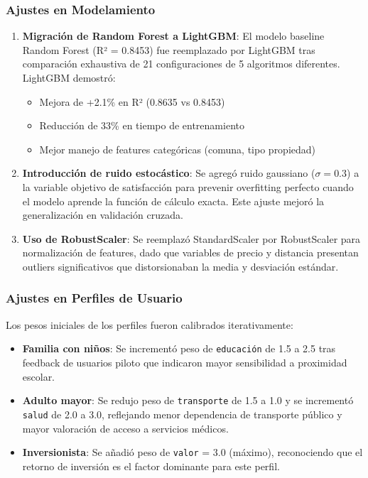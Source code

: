 \subsubsection{Ajustes en Modelamiento}

\begin{enumerate}
    \item \textbf{Migración de Random Forest a LightGBM}: El modelo baseline Random Forest (R² = 0.8453) fue reemplazado por LightGBM tras comparación exhaustiva de 21 configuraciones de 5 algoritmos diferentes. LightGBM demostró:
    \begin{itemize}
        \item Mejora de +2.1\% en R² (0.8635 vs 0.8453)
        \item Reducción de 33\% en tiempo de entrenamiento
        \item Mejor manejo de features categóricas (comuna, tipo propiedad)
    \end{itemize}
    
    \item \textbf{Introducción de ruido estocástico}: Se agregó ruido gaussiano ($\sigma = 0.3$) a la variable objetivo de satisfacción para prevenir overfitting perfecto cuando el modelo aprende la función de cálculo exacta. Este ajuste mejoró la generalización en validación cruzada.
    
    \item \textbf{Uso de RobustScaler}: Se reemplazó StandardScaler por RobustScaler para normalización de features, dado que variables de precio y distancia presentan outliers significativos que distorsionaban la media y desviación estándar.
\end{enumerate}

\subsubsection{Ajustes en Perfiles de Usuario}

Los pesos iniciales de los perfiles fueron calibrados iterativamente:
\begin{itemize}
    \item \textbf{Familia con niños}: Se incrementó peso de \texttt{educación} de 1.5 a 2.5 tras feedback de usuarios piloto que indicaron mayor sensibilidad a proximidad escolar.
    \item \textbf{Adulto mayor}: Se redujo peso de \texttt{transporte} de 1.5 a 1.0 y se incrementó \texttt{salud} de 2.0 a 3.0, reflejando menor dependencia de transporte público y mayor valoración de acceso a servicios médicos.
    \item \textbf{Inversionista}: Se añadió peso de \texttt{valor} = 3.0 (máximo), reconociendo que el retorno de inversión es el factor dominante para este perfil.
\end{itemize}

